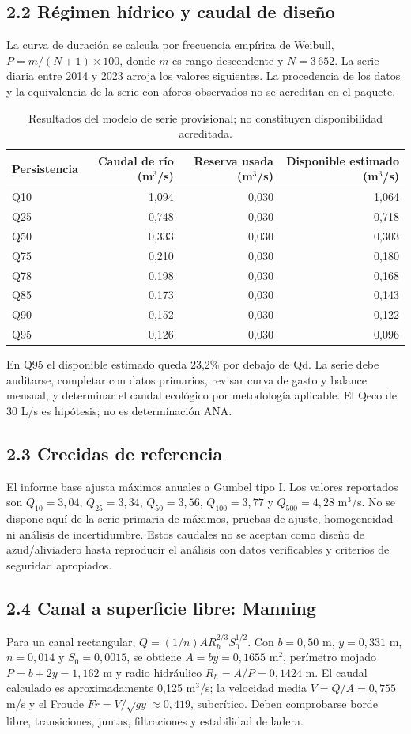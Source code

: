 \documentclass[11pt,a4paper]{article}
\begin{document}
\subsection*{2.2 Régimen hídrico y caudal de diseño}
La curva de duración se calcula por frecuencia empírica de Weibull, $P=m/(N+1)\times100$, donde $m$ es rango descendente y $N=3\,652$. La serie diaria entre 2014 y 2023 arroja los valores siguientes. La procedencia de los datos y la equivalencia de la serie con aforos observados no se acreditan en el paquete.
\begin{table}[H]\centering\small
\begin{tabular}{lrrr}\toprule Persistencia & Caudal de río (m$^3$/s) & Reserva usada (m$^3$/s) & Disponible estimado (m$^3$/s)\\\midrule
Q10 & 1,094 & 0,030 & 1,064\\ Q25 & 0,748 & 0,030 & 0,718\\ Q50 & 0,333 & 0,030 & 0,303\\ Q75 & 0,210 & 0,030 & 0,180\\ Q78 & 0,198 & 0,030 & 0,168\\ Q85 & 0,173 & 0,030 & 0,143\\ Q90 & 0,152 & 0,030 & 0,122\\ Q95 & 0,126 & 0,030 & 0,096\\\bottomrule
\end{tabular}\caption{Resultados del modelo de serie provisional; no constituyen disponibilidad acreditada.}\end{table}
En Q95 el disponible estimado queda 23,2\% por debajo de Qd. La serie debe auditarse, completar con datos primarios, revisar curva de gasto y balance mensual, y determinar el caudal ecológico por metodología aplicable. El Qeco de 30 L/s es hipótesis; no es determinación ANA.

\subsection*{2.3 Crecidas de referencia}
El informe base ajusta máximos anuales a Gumbel tipo I. Los valores reportados son $Q_{10}=3,04$, $Q_{25}=3,34$, $Q_{50}=3,56$, $Q_{100}=3,77$ y $Q_{500}=4,28$ m$^3$/s. No se dispone aquí de la serie primaria de máximos, pruebas de ajuste, homogeneidad ni análisis de incertidumbre. Estos caudales no se aceptan como diseño de azud/aliviadero hasta reproducir el análisis con datos verificables y criterios de seguridad apropiados.

\subsection*{2.4 Canal a superficie libre: Manning}
Para un canal rectangular, $Q=(1/n)AR_h^{2/3}S_0^{1/2}$. Con $b=0,50$ m, $y=0,331$ m, $n=0,014$ y $S_0=0,0015$, se obtiene $A=by=0,1655$ m$^2$, perímetro mojado $P=b+2y=1,162$ m y radio hidráulico $R_h=A/P=0,1424$ m. El caudal calculado es aproximadamente 0,125 m$^3$/s; la velocidad media $V=Q/A=0,755$ m/s y el Froude $Fr=V/\sqrt{gy}\approx0,419$, subcrítico. Deben comprobarse borde libre, transiciones, juntas, filtraciones y estabilidad de ladera.
\end{document}

